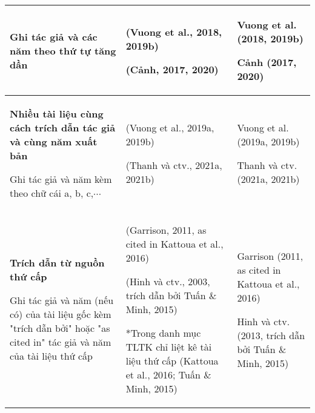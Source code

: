\begin{table*}
\begin{tabular}{|l|l|l|}
Ghi tác giả và các năm theo thứ tự tăng dần
    & (Vuong et al., 2018, 2019b)

(Cảnh, 2017, 2020)
 & Vuong et al. (2018, 2019b)

Cảnh (2017, 2020)
 \\
         \hline
  \textbf{Nhiều tài liệu cùng cách trích dẫn tác giả và cùng năm xuất bản}
  
Ghi tác giả và năm kèm theo chữ cái a, b, c,$\cdots$ & (Vuong et al., 2019a, 2019b)

(Thanh và ctv., 2021a, 2021b)
 & Vuong et al. (2019a, 2019b)

Thanh và ctv. (2021a, 2021b)
\\
         \hline
      \textbf{Trích dẫn từ nguồn thứ cấp}
      
Ghi tác giả và năm (nếu có) của tài liệu gốc kèm "trích dẫn bởi" hoặc "as cited in" tác giả và năm của tài liệu thứ cấp
   & (Garrison, 2011, as cited in Kattoua et al., 2016)

(Hinh và ctv., 2003, trích dẫn bởi Tuấn $\&$ Minh, 2015)

*Trong danh mục TLTK chỉ liệt kê tài liệu thứ cấp (Kattoua et al., 2016; Tuấn $\&$ Minh, 2015)
 & Garrison (2011, as cited in Kattoua et al., 2016) 

Hinh và ctv. (2013, trích dẫn bởi Tuấn $\&$ Minh, 2015)
\\
        \hline
  \end{tabular}
\end{table*}
